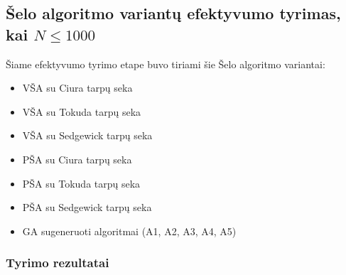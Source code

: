 \documentclass{VUMIFInfKursinis}
\begin{document}
\subsection{Šelo algoritmo variantų efektyvumo tyrimas, kai $N \leq 1000$}

Šiame efektyvumo tyrimo etape buvo tiriami šie Šelo algoritmo variantai:
\begin{itemize}
  \item VŠA su Ciura tarpų seka
  \item VŠA su Tokuda tarpų seka
  \item VŠA su Sedgewick tarpų seka
  \item PŠA su Ciura tarpų seka
  \item PŠA su Tokuda tarpų seka
  \item PŠA su Sedgewick tarpų seka
  \item GA sugeneruoti algoritmai (A1, A2, A3, A4, A5)
\end{itemize}

\subsubsection{Tyrimo rezultatai}
\end{document}
